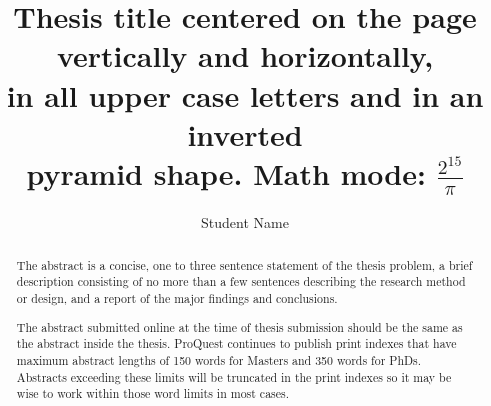 \documentclass[12pt]{mines-thesis}
\begin{document}
\autotitle %
\title{
	Thesis title centered on the page vertically and horizontally, \protect\\
	in all upper case letters and in an inverted\protect\\
	pyramid shape. 	Math mode: $\frac{2^{15}}{\pi}$
}
	
\author{Student Name}  %
	
	
\begin{abstract}
	The abstract is a concise, one to three sentence statement of the thesis problem, a brief description consisting of no more than a few sentences describing the research method or design, and a report of the major findings and conclusions.
			
	The abstract submitted online at the time of thesis submission should be the same as the abstract inside the thesis. ProQuest continues to publish print indexes that have maximum abstract lengths of 150 words for Masters and 350 words for PhDs. Abstracts exceeding these limits will be truncated in the print indexes so it may be wise to work within those word limits in most cases.
\end{abstract}

%			
%	
\end{document}
